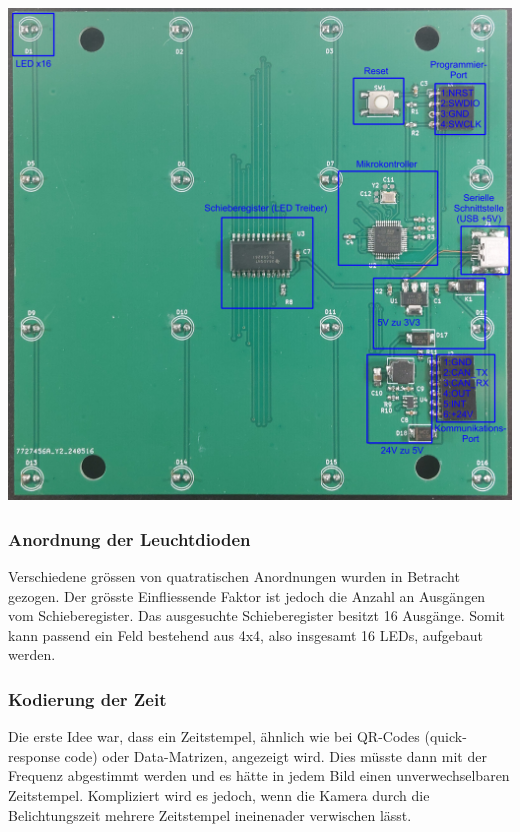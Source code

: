 \vspace{1em}
\includegraphics[width=\linewidth]{../images/phone/pcb-edit.png}
\vspace{-2.5em}
\label{img:PCB}

\subsubsection{Anordnung der Leuchtdioden}

Verschiedene grössen von quatratischen Anordnungen wurden in Betracht gezogen.
%
Der grösste Einfliessende Faktor ist jedoch die Anzahl an Ausgängen vom Schieberegister.
%
Das ausgesuchte Schieberegister besitzt 16 Ausgänge.
%
Somit kann passend ein Feld bestehend aus 4x4, also insgesamt 16 LEDs, aufgebaut werden.


\subsubsection{Kodierung der Zeit}

Die erste Idee war, dass ein Zeitstempel, ähnlich wie bei QR-Codes (quick-response code) oder Data-Matrizen, angezeigt wird.
%
Dies müsste dann mit der Frequenz abgestimmt werden und es hätte in jedem Bild einen unverwechselbaren Zeitstempel.
%
Kompliziert wird es jedoch, wenn die Kamera durch die Belichtungszeit mehrere Zeitstempel ineinenader verwischen lässt.


